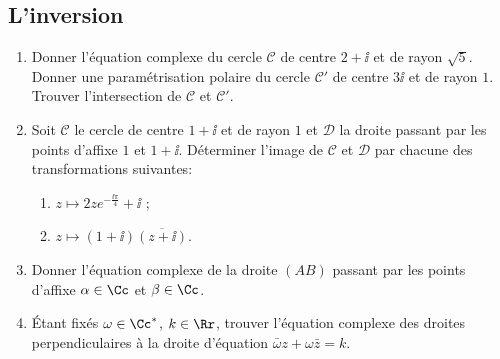 \documentclass[11pt,class=report,crop=false]{standalone}
\begin{document}
\subsection{L'inversion}


\begin{exercicecours}
\sauteligne
\begin{enumerate}
 
 \item Donner l'équation complexe du cercle $\mathcal{C}$ de centre $2+\ii$ et de rayon $\sqrt{5}$.
 Donner une paramétrisation polaire du cercle $\mathcal{C}'$ de centre $3\ii$ et de rayon $1$.
 Trouver l'intersection de $\mathcal{C}$ et  $\mathcal{C}'$.
 
 \item Soit $\mathcal{C}$ le cercle de centre $1+\ii$ et de rayon $1$ 
 et $\mathcal{D}$ la droite passant par les points d'affixe $1$ et $1+\ii$.
 Déterminer l'image de  $\mathcal{C}$ et $\mathcal{D}$ par chacune des transformations suivantes:
   \begin{enumerate}
     \item $z \mapsto 2 z e^{-\frac{\ii\pi}{4}} + \ii$ ;
     \item $z \mapsto (1+\ii)\overline{(z+\ii)}$.
   \end{enumerate}
   



 \item Donner l'équation complexe de la droite $(AB)$ passant par les points d'affixe $\alpha \in \Cc$ et $\beta\in \Cc$.
 
 \item \'Etant fixés $\omega \in \Cc^*$, $k\in \Rr$, trouver l'équation complexe des droites perpendiculaires à la droite d'équation $\bar \omega z + \omega \bar z = k$.

\end{enumerate}
\end{exercicecours}
\end{document}
